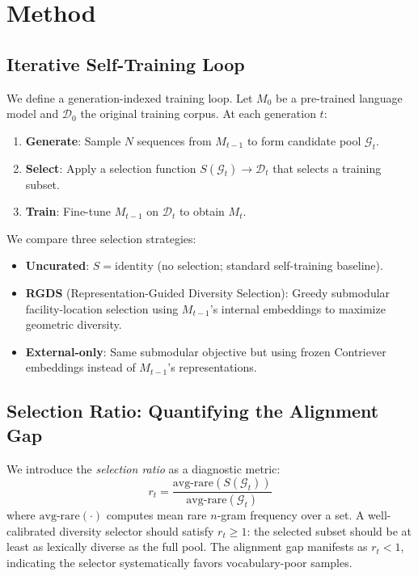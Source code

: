 \documentclass[11pt,a4paper]{article}
\begin{document}
\section{Method}
\label{sec:method}

\subsection{Iterative Self-Training Loop}

We define a generation-indexed training loop. Let $M_0$ be a pre-trained language model and $\mathcal{D}_0$ the original training corpus.
At each generation $t$:
\begin{enumerate}
\item \textbf{Generate}: Sample $N$ sequences from $M_{t-1}$ to form candidate pool $\mathcal{G}_t$.
\item \textbf{Select}: Apply a selection function $S(\mathcal{G}_t) \to \mathcal{D}_t$ that selects a training subset.
\item \textbf{Train}: Fine-tune $M_{t-1}$ on $\mathcal{D}_t$ to obtain $M_t$.
\end{enumerate}
We compare three selection strategies:
\begin{itemize}
\item \textbf{Uncurated}: $S = \text{identity}$ (no selection; standard self-training baseline).
\item \textbf{RGDS} (Representation-Guided Diversity Selection): Greedy submodular facility-location selection using $M_{t-1}$'s internal embeddings to maximize geometric diversity.
\item \textbf{External-only}: Same submodular objective but using frozen Contriever \cite{izacard2022contriever} embeddings instead of $M_{t-1}$'s representations.
\end{itemize}

\subsection{Selection Ratio: Quantifying the Alignment Gap}

We introduce the \emph{selection ratio} as a diagnostic metric:
\begin{equation}
r_t = \frac{\text{avg-rare}(S(\mathcal{G}_t))}{\text{avg-rare}(\mathcal{G}_t)}
\end{equation}
where $\text{avg-rare}(\cdot)$ computes mean rare $n$-gram frequency over a set.
A well-calibrated diversity selector should satisfy $r_t \geq 1$: the selected subset should be at least as lexically diverse as the full pool.
The alignment gap manifests as $r_t < 1$, indicating the selector systematically favors vocabulary-poor samples.
\end{document}
